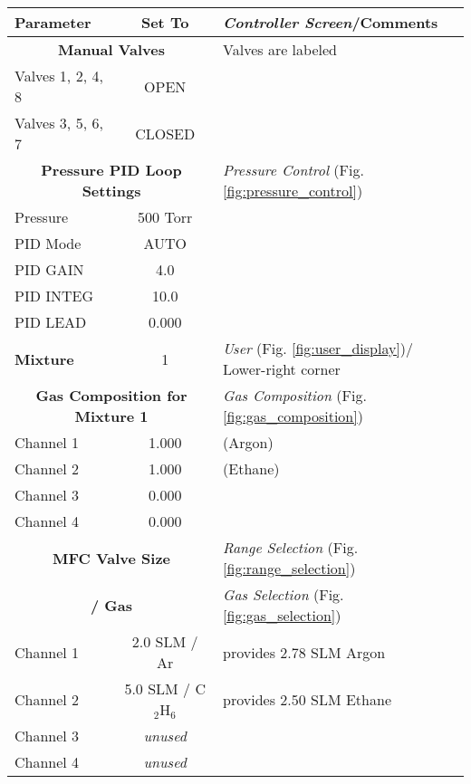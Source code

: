 \begin{table}[hbt]
\begin{minipage}[h!]{\textwidth}
{\scriptsize
\begin{center}
\begin{tabular}{|l|c|l|}
\hline
Parameter   & Set To   & {\it Controller Screen}/Comments\\ \hline
\multicolumn{2}{|c|}{\bf Manual Valves  } &  Valves are labeled        \\
Valves 1, 2, 4, 8 & OPEN                  &         \\
Valves 3, 5, 6, 7 & CLOSED                &         \\ \hline
\multicolumn{2}{|c|}{\bf Pressure PID Loop Settings   } & {\it Pressure Control} (Fig. \ref{fig:pressure_control})  \\
Pressure    & 500 Torr &                   \\
PID Mode    & AUTO     &                   \\
PID GAIN    & 4.0      &                   \\
PID INTEG   & 10.0     &                   \\
PID LEAD    & 0.000    &                   \\ \hline
\bf Mixture     & 1        & {\it User} (Fig. \ref{fig:user_display})/ Lower-right corner\\ \hline
\multicolumn{2}{|c|}{\bf Gas Composition for Mixture 1} & {\it Gas Composition} (Fig. \ref{fig:gas_composition})\\
Channel 1   & 1.000    &  (Argon)                 \\
Channel 2   & 1.000    &  (Ethane)                 \\
Channel 3   & 0.000    &                   \\
Channel 4   & 0.000    &                   \\ \hline
\multicolumn{2}{|c|}{\bf MFC Valve Size } & {\it Range Selection} (Fig. \ref{fig:range_selection})  \\
\multicolumn{2}{|c|}{\bf  / Gas}             & {\it Gas Selection} (Fig. \ref{fig:gas_selection})  \\
Channel 1   & 2.0 SLM / Ar         & provides 2.78 SLM Argon\\
Channel 2   & 5.0 SLM / C$_2$H$_6$ & provides 2.50 SLM Ethane\\
Channel 3   & \it unused&                  \\
Channel 4   & \it unused&                  \\ \hline

\end{tabular}
\end{center}}
\end{minipage}
\end{table}
